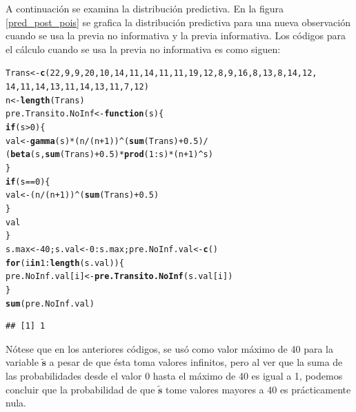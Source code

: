 \documentclass[10pt,openright]{book}\usepackage[]{graphicx}\usepackage[]{color}
\makeatletter
\newcommand{\hlnum}[1]{\textcolor[rgb]{0.686,0.059,0.569}{#1}}%
\newcommand{\hlopt}[1]{\textcolor[rgb]{0,0,0}{#1}}%
\newcommand{\hlstd}[1]{\textcolor[rgb]{0.345,0.345,0.345}{#1}}%
\newcommand{\hlkwa}[1]{\textcolor[rgb]{0.161,0.373,0.58}{\textbf{#1}}}%
\newcommand{\hlkwb}[1]{\textcolor[rgb]{0.69,0.353,0.396}{#1}}%
\newcommand{\hlkwc}[1]{\textcolor[rgb]{0.333,0.667,0.333}{#1}}%
\newcommand{\hlkwd}[1]{\textcolor[rgb]{0.737,0.353,0.396}{\textbf{#1}}}%
\newenvironment{kframe}{%
 \def\at@end@of@kframe{}%
 \ifinner\ifhmode%
  \def\at@end@of@kframe{\end{minipage}}%
  \begin{minipage}{\columnwidth}%
 \fi\fi%
 \def\FrameCommand##1{\hskip\@totalleftmargin \hskip-\fboxsep
 \colorbox{shadecolor}{##1}\hskip-\fboxsep
     \hskip-\linewidth \hskip-\@totalleftmargin \hskip\columnwidth}%
 \MakeFramed {\advance\hsize-\width
   \@totalleftmargin\z@ \linewidth\hsize
   \@setminipage}}%
 {\par\unskip\endMakeFramed%
 \at@end@of@kframe}
\newenvironment{knitrout}{}{} %
\makeatother
\begin{document}
\begin{Eje}
    A continuaci\'on se examina la distribuci\'on predictiva. En la figura \ref{pred_post_pois} se grafica la distribuci\'on predictiva para una nueva observaci\'on cuando se usa la previa no informativa y la previa informativa. Los c\'odigos para el c\'alculo cuando se usa la previa no informativa es como siguen:
\begin{knitrout}
\color{fgcolor}\begin{kframe}
\begin{alltt}
\hlstd{Trans} \hlkwb{<-} \hlkwd{c}\hlstd{(}\hlnum{22}\hlstd{,} \hlnum{9}\hlstd{,} \hlnum{9}\hlstd{,} \hlnum{20}\hlstd{,} \hlnum{10}\hlstd{,} \hlnum{14}\hlstd{,} \hlnum{11}\hlstd{,} \hlnum{14}\hlstd{,} \hlnum{11}\hlstd{,} \hlnum{11}\hlstd{,} \hlnum{19}\hlstd{,} \hlnum{12}\hlstd{,} \hlnum{8}\hlstd{,} \hlnum{9}\hlstd{,} \hlnum{16}\hlstd{,} \hlnum{8}\hlstd{,} \hlnum{13}\hlstd{,} \hlnum{8}\hlstd{,} \hlnum{14}\hlstd{,} \hlnum{12}\hlstd{,}
\hlnum{14}\hlstd{,} \hlnum{11}\hlstd{,} \hlnum{14}\hlstd{,} \hlnum{13}\hlstd{,} \hlnum{11}\hlstd{,} \hlnum{14}\hlstd{,} \hlnum{13}\hlstd{,} \hlnum{11}\hlstd{,} \hlnum{7}\hlstd{,} \hlnum{12} \hlstd{)}
\hlstd{n} \hlkwb{<-} \hlkwd{length}\hlstd{(Trans)}
\hlstd{pre.Transito.NoInf} \hlkwb{<-} \hlkwa{function}\hlstd{(}\hlkwc{s}\hlstd{)\{}
\hlkwa{if}\hlstd{(s}\hlopt{>}\hlnum{0}\hlstd{)\{}
  \hlstd{val} \hlkwb{<-} \hlkwd{gamma}\hlstd{(s)}\hlopt{*}\hlstd{(n}\hlopt{/}\hlstd{(n}\hlopt{+}\hlnum{1}\hlstd{))}\hlopt{^}\hlstd{(}\hlkwd{sum}\hlstd{(Trans)}\hlopt{+}\hlnum{0.5}\hlstd{)}\hlopt{/}
      \hlstd{(}\hlkwd{beta}\hlstd{(s,}\hlkwd{sum}\hlstd{(Trans)}\hlopt{+}\hlnum{0.5}\hlstd{)}\hlopt{*}\hlkwd{prod}\hlstd{(}\hlnum{1}\hlopt{:}\hlstd{s)}\hlopt{*}\hlstd{(n}\hlopt{+}\hlnum{1}\hlstd{)}\hlopt{^}\hlstd{s)}
\hlstd{\}}
\hlkwa{if}\hlstd{(s}\hlopt{==}\hlnum{0}\hlstd{)\{}
 \hlstd{val} \hlkwb{<-} \hlstd{(n}\hlopt{/}\hlstd{(n}\hlopt{+}\hlnum{1}\hlstd{))}\hlopt{^}\hlstd{(}\hlkwd{sum}\hlstd{(Trans)}\hlopt{+}\hlnum{0.5}\hlstd{)}
\hlstd{\}}
\hlstd{val}
\hlstd{\}}
\hlstd{s.max} \hlkwb{<-} \hlnum{40}\hlstd{; s.val} \hlkwb{<-} \hlnum{0}\hlopt{:}\hlstd{s.max; pre.NoInf.val} \hlkwb{<-} \hlkwd{c}\hlstd{()}
\hlkwa{for}\hlstd{(i} \hlkwa{in} \hlnum{1}\hlopt{:}\hlkwd{length}\hlstd{(s.val))\{}
\hlstd{pre.NoInf.val[i]} \hlkwb{<-} \hlkwd{pre.Transito.NoInf}\hlstd{(s.val[i])}
\hlstd{\}}
\hlkwd{sum}\hlstd{(pre.NoInf.val)}
\end{alltt}
\begin{verbatim}
## [1] 1
\end{verbatim}
\end{kframe}
\end{knitrout}
    N\'otese que en los anteriores c\'odigos, se us\'o como valor m\'aximo de 40 para la variable $\mathbf{\tilde{s}}$ a pesar de que \'esta toma valores infinitos, pero al ver que la suma de las probabilidades desde el valor 0 hasta el m\'aximo de 40 es igual a 1, podemos concluir que la probabilidad de que $\mathbf{\tilde{s}}$ tome valores mayores a 40 es pr\'acticamente nula.
    

\end{Eje}
\end{document}
